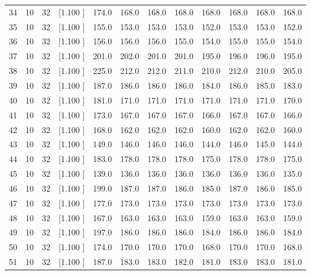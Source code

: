 \documentclass[12pt,a4paper]{article}
\begin{document}
\begin{center}
{\begin{tabular}{r r r r r r r r r r r r}
  34& 10& 32&[1.100     ]&   174.0&   168.0&   168.0&   168.0&   168.0&   168.0&   168.0&   168.0\\[-0.02in]
  35& 10& 32&[1.100     ]&   155.0&   153.0&   153.0&   153.0&   152.0&   153.0&   153.0&   152.0\\[-0.02in]
  36& 10& 32&[1.100     ]&   156.0&   156.0&   156.0&   155.0&   154.0&   155.0&   155.0&   154.0\\[-0.02in]
  37& 10& 32&[1.100     ]&   201.0&   202.0&   201.0&   201.0&   195.0&   196.0&   196.0&   195.0\\[-0.02in]
  38& 10& 32&[1.100     ]&   225.0&   212.0&   212.0&   211.0&   210.0&   212.0&   210.0&   205.0\\[-0.02in]
  39& 10& 32&[1.100     ]&   187.0&   186.0&   186.0&   186.0&   184.0&   186.0&   185.0&   183.0\\[-0.02in]
  40& 10& 32&[1.100     ]&   181.0&   171.0&   171.0&   171.0&   171.0&   171.0&   171.0&   170.0\\[-0.02in]
  41& 10& 32&[1.100     ]&   173.0&   167.0&   167.0&   167.0&   166.0&   167.0&   167.0&   166.0\\[-0.02in]
  42& 10& 32&[1.100     ]&   168.0&   162.0&   162.0&   162.0&   160.0&   162.0&   162.0&   160.0\\[-0.02in]
  43& 10& 32&[1.100     ]&   149.0&   146.0&   146.0&   146.0&   144.0&   146.0&   145.0&   144.0\\[-0.02in]
  44& 10& 32&[1.100     ]&   183.0&   178.0&   178.0&   178.0&   175.0&   178.0&   178.0&   175.0\\[-0.02in]
  45& 10& 32&[1.100     ]&   139.0&   136.0&   136.0&   136.0&   136.0&   136.0&   136.0&   135.0\\[-0.02in]
  46& 10& 32&[1.100     ]&   199.0&   187.0&   187.0&   186.0&   185.0&   187.0&   186.0&   185.0\\[-0.02in]
  47& 10& 32&[1.100     ]&   177.0&   173.0&   173.0&   173.0&   173.0&   173.0&   173.0&   173.0\\[-0.02in]
  48& 10& 32&[1.100     ]&   167.0&   163.0&   163.0&   163.0&   159.0&   163.0&   163.0&   159.0\\[-0.02in]
  49& 10& 32&[1.100     ]&   197.0&   186.0&   186.0&   186.0&   184.0&   186.0&   186.0&   184.0\\[-0.02in]
  50& 10& 32&[1.100     ]&   174.0&   170.0&   170.0&   170.0&   168.0&   170.0&   170.0&   168.0\\[-0.02in]
  51& 10& 32&[1.100     ]&   187.0&   183.0&   183.0&   182.0&   181.0&   183.0&   183.0&   181.0\\[-0.02in]

\end{tabular}}
\end{center}
\end{document}
